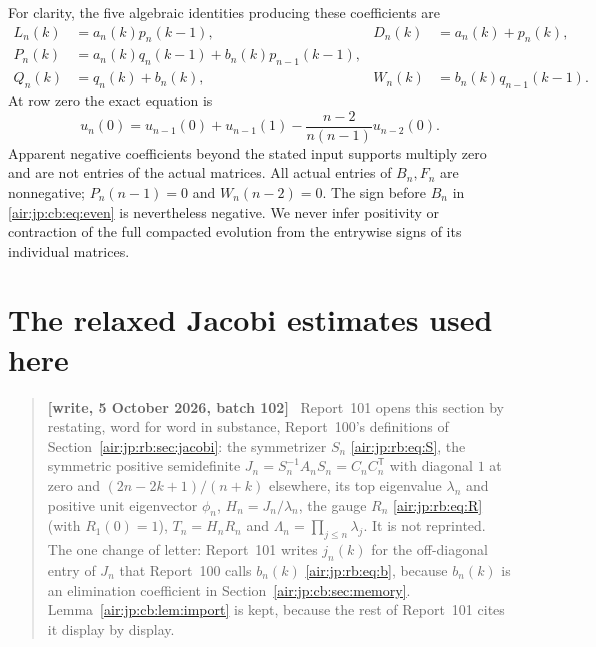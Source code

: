 \documentclass[11pt,letterpaper]{article}
\numberwithin{equation}{section}
\theoremstyle{remark}
\newenvironment{writenotejp}{\par\smallskip\begin{quote}\small\textbf{[write, 5 October 2026, batch 102]}\ }{\end{quote}\smallskip}
\begin{document}
For clarity, the five algebraic identities producing these coefficients are
\begin{align*}
 L_n(k)&=a_n(k)p_n(k-1),&D_n(k)&=a_n(k)+p_n(k),\\
 P_n(k)&=a_n(k)q_n(k-1)+b_n(k)p_{n-1}(k-1),\\
 Q_n(k)&=q_n(k)+b_n(k),&W_n(k)&=b_n(k)q_{n-1}(k-1).
\end{align*}
At row zero the exact equation is
\[
 u_n(0)=u_{n-1}(0)+u_{n-1}(1)-\frac{n-2}{n(n-1)}u_{n-2}(0).
\]
Apparent negative coefficients beyond the stated input supports multiply zero and are not entries of the actual matrices. All actual entries of $B_n,F_n$ are nonnegative; $P_n(n-1)=0$ and $W_n(n-2)=0$. The sign before $B_n$ in \eqref{air:jp:cb:eq:even} is nevertheless negative. We never infer positivity or contraction of the full compacted evolution from the entrywise signs of its individual matrices.

\section{The relaxed Jacobi estimates used here}\label{air:jp:cb:sec:import}
\begin{writenotejp}
Report~101 opens this section by restating, word for word in substance, Report~100's definitions of Section~\ref{air:jp:rb:sec:jacobi}: the symmetrizer $S_n$ \eqref{air:jp:rb:eq:S}, the symmetric positive semidefinite $J_n=S_n^{-1}A_nS_n=C_nC_n^{\mathsf T}$ with diagonal $1$ at zero and $(2n-2k+1)/(n+k)$ elsewhere, its top eigenvalue $\lambda_n$ and positive unit eigenvector $\phi_n$, $H_n=J_n/\lambda_n$, the gauge $R_n$ \eqref{air:jp:rb:eq:R} (with $R_1(0)=1$), $T_n=H_nR_n$ and $\Lambda_n=\prod_{j\le n}\lambda_j$. It is not reprinted. The one change of letter: Report~101 writes $j_n(k)$ for the off-diagonal entry of $J_n$ that Report~100 calls $b_n(k)$ \eqref{air:jp:rb:eq:b}, because $b_n(k)$ is an elimination coefficient in Section~\ref{air:jp:cb:sec:memory}. Lemma~\ref{air:jp:cb:lem:import} is kept, because the rest of Report~101 cites it display by display.
\end{writenotejp}
\end{document}

